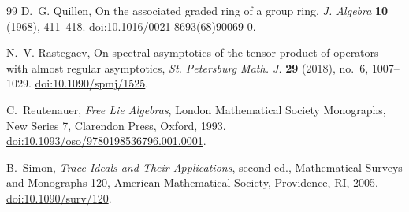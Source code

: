 \documentclass[10pt,reqno]{amsart}
\theoremstyle{plain}
\theoremstyle{definition}
\theoremstyle{remark}
\begin{document}
\begin{thebibliography}{99}
D.~G. Quillen,
On the associated graded ring of a group ring,
\emph{J. Algebra} \textbf{10} (1968), 411--418.
\href{https://doi.org/10.1016/0021-8693(68)90069-0}
{doi:10.1016/0021-8693(68)90069-0}.

N.~V. Rastegaev,
On spectral asymptotics of the tensor product of operators with almost
regular asymptotics,
\emph{St. Petersburg Math. J.} \textbf{29} (2018), no.~6, 1007--1029.
\href{https://doi.org/10.1090/spmj/1525}
{doi:10.1090/spmj/1525}.

C.~Reutenauer,
\emph{Free Lie Algebras}, London Mathematical Society Monographs, New
Series 7, Clarendon Press, Oxford, 1993.
\href{https://doi.org/10.1093/oso/9780198536796.001.0001}
{doi:10.1093/oso/9780198536796.001.0001}.

B.~Simon,
\emph{Trace Ideals and Their Applications}, second ed.,
Mathematical Surveys and Monographs 120, American Mathematical Society,
Providence, RI, 2005.
\href{https://doi.org/10.1090/surv/120}
{doi:10.1090/surv/120}.

\end{thebibliography}
\end{document}
